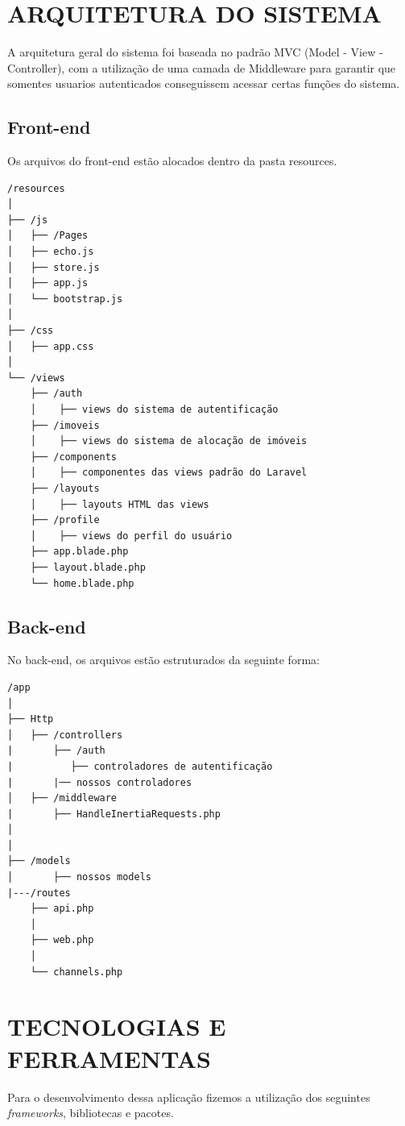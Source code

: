 \section{ARQUITETURA DO SISTEMA}

A arquitetura geral do sistema foi baseada no padrão MVC (Model - View - Controller), com a utilização de uma camada de Middleware para garantir que somentes usuarios autenticados conseguissem acessar certas funções do sistema.

\subsection{Front-end}

Os arquivos do front-end estão alocados dentro da pasta resources.

\begin{verbatim}
/resources
│
├── /js
│   ├── /Pages
│   ├── echo.js
│   ├── store.js
│   ├── app.js              
│   └── bootstrap.js         
│
├── /css                   
│   ├── app.css            
│   
└── /views
    ├── /auth    
    │    ├── views do sistema de autentificação
    ├── /imoveis   
    │    ├── views do sistema de alocação de imóveis
    ├── /components  
    │    ├── componentes das views padrão do Laravel
    ├── /layouts   
    │    ├── layouts HTML das views
    ├── /profile   
    │    ├── views do perfil do usuário
    ├── app.blade.php
    ├── layout.blade.php    
    └── home.blade.php  
\end{verbatim}
    

\subsection{Back-end}

No back-end, os arquivos estão estruturados da seguinte forma:

\begin{verbatim}
/app
│
├── Http
│   ├── /controllers  
|       ├── /auth
|          ├── controladores de autentificação
|       |── nossos controladores
│   ├── /middleware
|       ├── HandleInertiaRequests.php
│               
│
├── /models                 
│       ├── nossos models
|---/routes
    ├── api.php             
    │
    ├── web.php                
    │
    └── channels.php               
\end{verbatim}







\section{TECNOLOGIAS E FERRAMENTAS}
Para o desenvolvimento dessa aplicação fizemos a utilização dos seguintes \textit{frameworks}, bibliotecas e pacotes.

